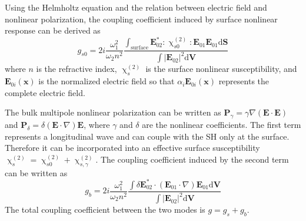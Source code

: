 \documentclass[a4paper,8pt,hyperref, twocolumn]{article}
\begin{document}
Using the Helmholtz equation and the relation between electric field and nonlinear polarization, the coupling coefficient induced by surface nonlinear response can be derived as
\begin{equation}
g_{s0} = 2i\frac{\omega_1^2}{\omega_2n^2}\frac{\int_{\mathrm{surface} } \mathbf{E}_{02}^*:\upchi^{(2)}_{s0}:\mathbf{E}_{01}\mathbf{E}_{01} \mathrm{d}	\mathbf{S}}{\int |\mathbf{E}_{02}|^2 \mathrm{d}	\mathbf{V}}
\end{equation}
where $n$ is the refractive index, $\upchi^{(2)}_s$ is the surface nonlinear susceptibility, and $\mathbf{E}_{0i}(\mathbf{x})$ is the  normalized electric field so that $\alpha_i\mathbf{E}_{0i}(\mathbf{x})$ represents the complete electric field. 

The bulk multipole nonlinear polarization can be written as $\mathbf{P}_\gamma =  \gamma\nabla(\mathbf{E}\cdot\mathbf{E})$ and $\mathbf{P}_\delta =  \delta(\mathbf{E}\cdot\nabla)\mathbf{E}$, where $\gamma$ and $\delta$ are the nonlinear coefficients. The first term represents a longitudinal wave and can couple with the SH only at the surface. Therefore it can be incorporated into an effective surface susceptibility $\upchi^{(2)}_s = \upchi^{(2)}_{s0}+\upchi^{(2)}_{s,\gamma}$\cite{heinz1991second}. The coupling coefficient induced by the second term can be written as %
\begin{equation}
g_b =  2i\frac{\omega_1^2}{\omega_2n^2}\frac{\int \delta\mathbf{E}_{02}^* \cdot (\mathbf{E}_{01}\cdot\nabla)\mathbf{E}_{01} \mathrm{d}	\mathbf{V}}{\int |\mathbf{E}_{02}|^2 \mathrm{d} \mathbf{V}}
\label{eq:gb}
\end{equation}
The total coupling coefficient between the two modes is $g = g_s+g_b$. 
\end{document}
